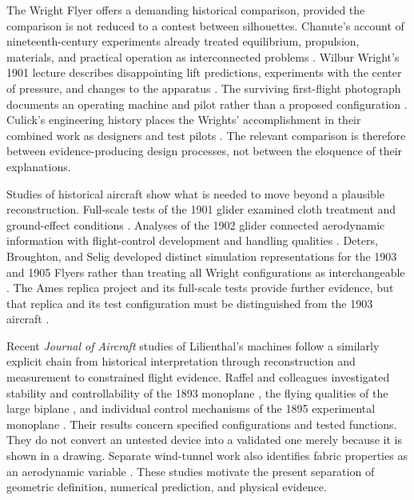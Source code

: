 \documentclass[11pt,a4paper]{article}
\begin{document}
The Wright Flyer offers a demanding historical comparison, provided the comparison is not reduced to a contest between silhouettes. Chanute's account of nineteenth-century experiments already treated equilibrium, propulsion, materials, and practical operation as interconnected problems \cite{ref1}. Wilbur Wright's 1901 lecture describes disappointing lift predictions, experiments with the center of pressure, and changes to the apparatus \cite{ref2}. The surviving first-flight photograph documents an operating machine and pilot rather than a proposed configuration \cite{ref4}. Culick's engineering history places the Wrights' accomplishment in their combined work as designers and test pilots \cite{ref5}. The relevant comparison is therefore between evidence-producing design processes, not between the eloquence of their explanations.

Studies of historical aircraft show what is needed to move beyond a plausible reconstruction. Full-scale tests of the 1901 glider examined cloth treatment and ground-effect conditions \cite{ref8}. Analyses of the 1902 glider connected aerodynamic information with flight-control development and handling qualities \cite{ref7,ref9}. Deters, Broughton, and Selig developed distinct simulation representations for the 1903 and 1905 Flyers rather than treating all Wright configurations as interchangeable \cite{ref11}. The Ames replica project and its full-scale tests provide further evidence, but that replica and its test configuration must be distinguished from the 1903 aircraft \cite{ref12,ref13}.

Recent \emph{Journal of Aircraft} studies of Lilienthal's machines follow a similarly explicit chain from historical interpretation through reconstruction and measurement to constrained flight evidence. Raffel and colleagues investigated stability and controllability of the 1893 monoplane \cite{ref16}, the flying qualities of the large biplane \cite{ref17}, and individual control mechanisms of the 1895 experimental monoplane \cite{ref18}. Their results concern specified configurations and tested functions. They do not convert an untested device into a validated one merely because it is shown in a drawing. Separate wind-tunnel work also identifies fabric properties as an aerodynamic variable \cite{ref19}. These studies motivate the present separation of geometric definition, numerical prediction, and physical evidence.
\end{document}
